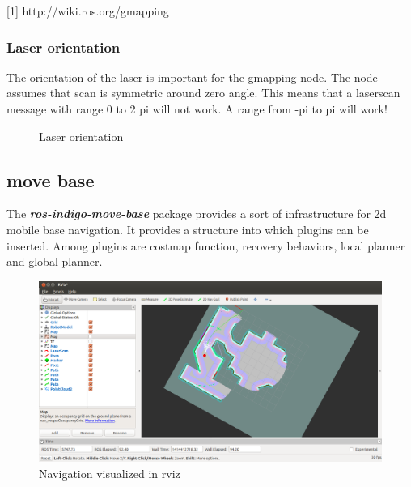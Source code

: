 \documentclass[a4paper]{article}
\newcommand{\rospackage}[1]{\textbf{\textit{ros-indigo-#1}}}
\begin{document}
[1] http://wiki.ros.org/gmapping

\subsubsection{Laser orientation}

The orientation of the laser is important for the gmapping node. The node assumes that
scan is symmetric around zero angle. This means that a laserscan message with range
0 to 2 pi will not work. A range from -pi to pi will work!

\begin{figure}[h!]
  \centering
  \caption{Laser orientation}
  \label{fig:laserorientation}
\end{figure}

\subsection{move base}

The \rospackage{move-base} package provides a sort of infrastructure for 2d mobile base
navigation. It provides a structure into which plugins can be inserted.
Among plugins are costmap function, recovery behaviors, local planner and global planner.

\begin{figure}[h!]
  \centering
  \includegraphics[width=\textwidth,height=\textheight,keepaspectratio]{img/rviz_navigation2.png}
  \caption{Navigation visualized in rviz}
  \label{fig:navrviz}
\end{figure}
\end{document}
